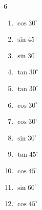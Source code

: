 \begin{multicols}{6}
\begin{enumerate}

  \item $\displaystyle \cos{30^\circ}$


  \item $\displaystyle \sin{45^\circ}$


  \item $\displaystyle \sin{30^\circ}$


  \item $\displaystyle \tan{30^\circ}$


  \item $\displaystyle \tan{30^\circ}$


  \item $\displaystyle \cos{30^\circ}$


\columnbreak %

  \item $\displaystyle \cos{30^\circ}$


  \item $\displaystyle \sin{30^\circ}$


  \item $\displaystyle \tan{45^\circ}$

        \phantom{$\displaystyle =1$}

  \item $\displaystyle \cos{45^\circ}$


  \item $\displaystyle \sin{60^\circ}$


  \item $\displaystyle \cos{45^\circ}$



\end{enumerate}
\end{multicols}
